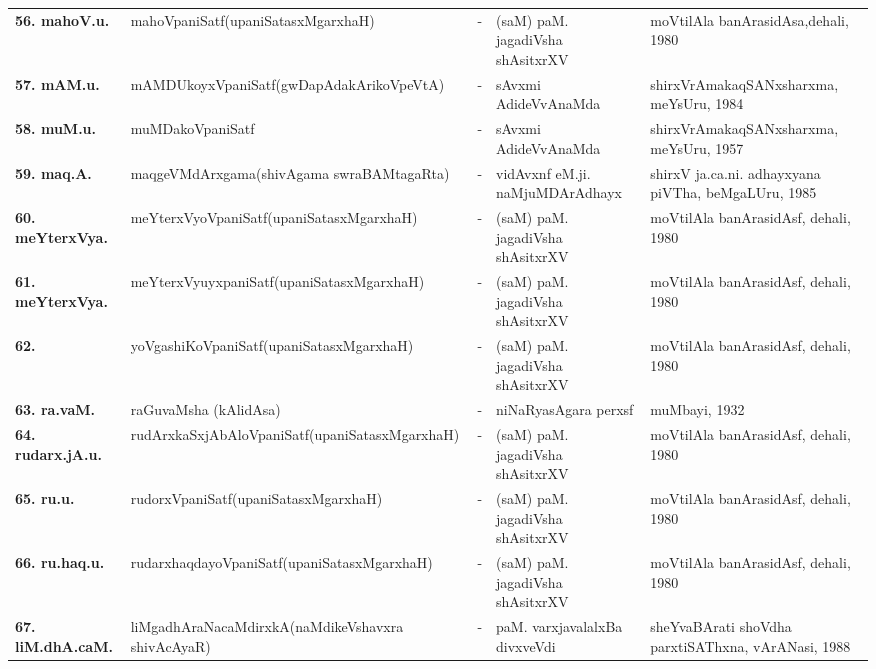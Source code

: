 {\begin{longtable}{lp{5cm}cp{5cm}<{\raggedright}p{3cm}<{\raggedright}@{}}
{\bf 56. mahoV.u.} & mahoVpaniSatf\newline (upaniSatasxMgarxhaH) &-& (saM) paM. jagadiVsha shAsitxrXV & moVtilAla banArasidAsa,\newline dehali, 1980\\
{\bf 57. mAM.u.} & mAMDUkoyxVpaniSatf\newline (gwDapAdakArikoVpeVtA) &-& sAvxmi AdideVvAnaMda & shirxVrAmakaqSANxsharxma, meYsUru, 1984\\
{\bf 58. muM.u.} & muMDakoVpaniSatf &-& sAvxmi AdideVvAnaMda & shirxVrAmakaqSANxsharxma, meYsUru, 1957\\
{\bf 59. maq.A.} & maqgeVMdArxgama\newline (shivAgama swraBAMtagaRta) &-& vidAvxnf eM.ji. naMjuMDArAdhayx & shirxV ja.ca.ni. adhayxyana piVTha, beMgaLUru, 1985\\
{\bf 60. meYterxVya.} & meYterxVyoVpaniSatf\newline (upaniSatasxMgarxhaH) &-& (saM) paM. jagadiVsha shAsitxrXV & moVtilAla banArasidAsf, dehali, 1980\\
{\bf 61. meYterxVya.} & meYterxVyuyxpaniSatf\newline (upaniSatasxMgarxhaH) &-& (saM) paM. jagadiVsha shAsitxrXV & moVtilAla banArasidAsf, dehali, 1980\\
{\bf 62. } & yoVgashiKoVpaniSatf\newline (upaniSatasxMgarxhaH) &-& (saM) paM. jagadiVsha shAsitxrXV & moVtilAla banArasidAsf, dehali, 1980\\
{\bf 63. ra.vaM.} & raGuvaMsha (kAlidAsa) &-& niNaRyasAgara perxsf & muMbayi, 1932\\
{\bf 64. rudarx.jA.u.} & rudArxkaSxjAbAloVpaniSatf\newline (upaniSatasxMgarxhaH) &-& (saM) paM. jagadiVsha shAsitxrXV & moVtilAla banArasidAsf, dehali, 1980\\
{\bf 65. ru.u.} & rudorxVpaniSatf\newline (upaniSatasxMgarxhaH) &-& (saM) paM. jagadiVsha shAsitxrXV & moVtilAla banArasidAsf, dehali, 1980\\
{\bf 66. ru.haq.u.} & rudarxhaqdayoVpaniSatf\newline (upaniSatasxMgarxhaH) &-& (saM) paM. jagadiVsha shAsitxrXV & moVtilAla banArasidAsf, dehali, 1980\\
{\bf 67. liM.dhA.caM.} & liMgadhAraNacaMdirxkA\newline (naMdikeVshavxra shivAcAyaR) &-& paM. varxjavalalxBa divxveVdi & sheYvaBArati shoVdha parxtiSAThxna, vArANasi, 1988\\

\end{longtable}}
